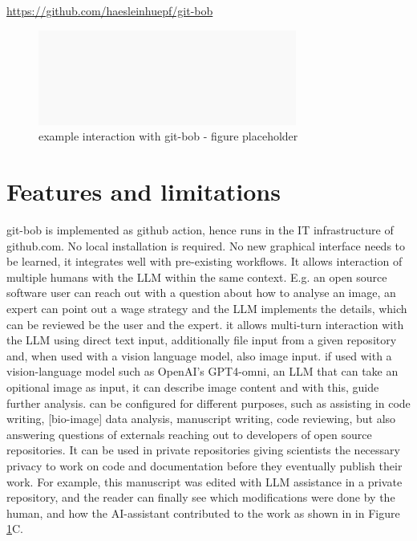 \documentclass{ecai}
\begin{document}
\url{https://github.com/haesleinhuepf/git-bob}

\begin{figure}[h]
    \centering
    \includegraphics[width=8.5cm]{fig1_example_interaction.png}
    \caption{example interaction with git-bob - figure placeholder}
    \label{fig:exampleinteraction}
    \end{figure}


\section{Features and limitations}

git-bob is implemented as github action, hence runs in the IT infrastructure of github.com. 
No local installation is required.
No new graphical interface needs to be learned, it integrates well with pre-existing workflows.
It allows interaction of multiple humans with the LLM within the same context. E.g. an open source software user can reach out with a question about how to analyse an image, an expert can point out a wage strategy and the LLM implements the details, which can be reviewed be the user and the expert.
it allows multi-turn interaction with the LLM using direct text input, additionally file input from a given repository and, when used with a vision language model, also image input. if used with a vision-language model such as OpenAI's GPT4-omni, an LLM that can take an opitional image as input, it can describe image content and with this, guide further analysis.
can be configured for different purposes, such as assisting in code writing, [bio-image] data analysis, manuscript writing, code reviewing, but also answering questions of externals reaching out to developers of open source repositories.
It can be used in private repositories giving scientists the necessary privacy to work on code and documentation before they eventually publish their work. For example, this manuscript was edited with LLM assistance in a private repository, and the reader can finally see which modifications were done by the human, and how the AI-assistant contributed to the work as shown in in Figure \ref{fig:exampleinteraction}C.
\end{document}
